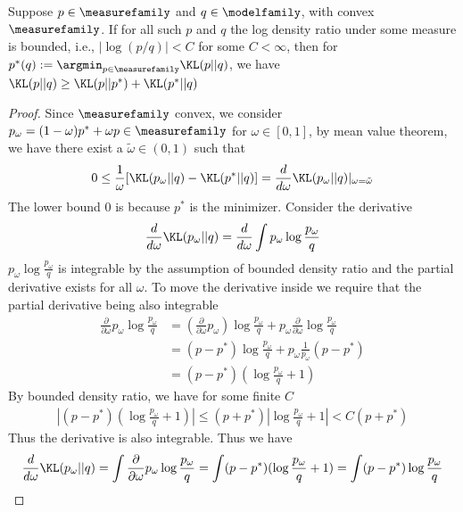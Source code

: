 \begin{myLemma}
\label{lemma:pyth}
Suppose $p\in \measurefamily$ and $q\in \modelfamily$, with convex $\measurefamily$. If for all such $p$ and $q$ the log density ratio under some measure is bounded, i.e., $|\log(p/q)|<C$ for some $C<\infty$, then for $p^*(q):=\argmin_{p\in \measurefamily}\KL(p||q)$, we have $\KL(p||q)\ge \KL(p||p^*) + \KL(p^*||q)$
\end{myLemma}
\begin{proof}
    Since $\measurefamily$ convex, we consider $p_{\omega} = (1-\omega)p^*+\omega p\in \measurefamily$ for $\omega\in [0,1]$, by mean value theorem, we have there exist a $\tilde{\omega} \in (0,1)$ such that 
    \begin{align*}
        0\le \frac{1}{\omega} [\KL( p_{\omega }||q)-\KL(p^*||q)]=\frac{d}{d\omega} \KL( p_{\omega }||q) \vert_{\omega = \tilde{\omega}}
    \end{align*}
    The lower bound 0 is because $p^*$ is the minimizer. Consider the derivative 
    \begin{align*}
        \frac{d}{d\omega} \KL( p_{\omega }||q)=\frac{d}{d\omega} \int p_{\omega} \log \frac{p_{\omega}}{q}
    \end{align*}
    $p_{\omega} \log \frac{p_{\omega}}{q}$ is integrable by the assumption of bounded density ratio and the partial derivative exists for all $\omega$.
    To move the derivative inside we require that the partial derivative being also integrable
    \begin{align*}
        \frac{\partial}{\partial \omega} p_{\omega} \log \frac{p_{\omega}}{q}&= \left(\frac{\partial}{\partial \omega} p_{\omega}\right) \log \frac{p_{\omega}}{q} + p_{\omega} \frac{\partial}{\partial \omega} \log\frac{p_{\omega}}{q}\\
        &=(p-p^*)\log \frac{p_{\omega}}{q}+p_{\omega}\frac{1}{p_{\omega}} (p-p^*)\\
        &=(p-p^*)(\log \frac{p_{\omega}}{q}+1)
    \end{align*}
    By bounded density ratio, we have for some finite $C$
    \begin{align*}
        |(p-p^*)(\log \frac{p_{\omega}}{q}+1)|\le (p+p^*)\left|\log \frac{p_{\omega}}{q}+1\right|<C(p+p^*)
    \end{align*} 
    Thus the derivative is also integrable. Thus we have 
    \begin{align*}
        \frac{d}{d\omega} \KL( p_{\omega }||q) = \int \frac{\partial}{\partial \omega} p_{\omega} \log \frac{p_{\omega}}{q} = \int (p-p^*)(\log \frac{p_{\omega}}{q}+1) = \int (p-p^*)\log \frac{p_{\omega}}{q}

\end{align*}
\end{proof}
